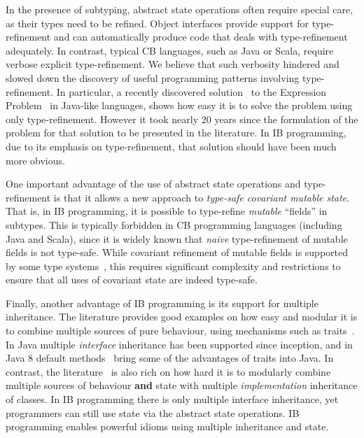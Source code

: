 In the presence of subtyping, abstract state operations often require
special care, as their types need to be refined. Object interfaces
provide support for type-refinement and can automatically produce code
that deals with type-refinement adequately. In contrast, typical CB
languages, such as Java or Scala, require verbose explicit
type-refinement. We believe that such verbosity hindered and slowed
down the discovery of useful programming patterns involving
type-refinement. In particular, a recently discovered
solution~\cite{eptrivially} to the Expression
Problem~\cite{wadler98expression} in Java-like languages, shows how easy it is to solve
the problem using only type-refinement. However it took nearly 20
years since the formulation of the problem for that
solution to be presented in the literature. In IB programming, due to
its emphasis on type-refinement, that solution should have been much
more obvious.

One important advantage of the use of abstract state operations and
type-refinement is that it allows a new approach to
\emph{type-safe covariant mutable state}. That is, in IB programming,
it is possible to type-refine \emph{mutable} ``fields'' in subtypes. This is
typically forbidden in CB programming languages (including Java and
Scala), since it is widely known that \emph{naive} type-refinement of
mutable fields is not type-safe. While covariant refinement of mutable
fields is supported by some type systems~\cite{bruce98astatically,bruce1994paradigmatic,ernst06virtual,Saito2013933}, this requires
significant complexity and restrictions to ensure that all uses of
covariant state are indeed type-safe. 

\begin{comment}
\marcoT{%

In this paper we show how to support type-safe
\textbf{field removal},
\textbf{field type refinement} allowing a kind of covariant setters refinement,
and \textbf{multiple inheritance}.}
\end{comment}

Finally, another advantage of IB programming is its support for
multiple inheritance. The literature provides good examples on how
easy and modular it is to combine multiple sources of pure behaviour,
using mechanisms such as traits~\cite{scharli03traits}. In Java
multiple \emph{interface} inheritance has been supported since
inception, and in Java 8 default methods~\cite{goetz12fdefenders} bring some of the
advantages of traits into Java. In contrast, the literature~\cite{Sak89dis,bracha90mixin,malayeri2009cz}
is also rich on how hard it is to modularly combine multiple sources
of behaviour \textbf{and} state with multiple \emph{implementation}
inheritance of classes. In IB programming there is only multiple
interface inheritance, yet programmers can still use state via the
abstract state operations. IB programming enables powerful 
idioms using multiple inheritance and state.

